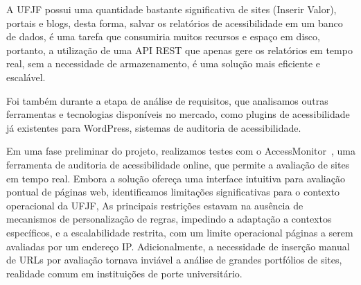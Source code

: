 \documentclass[12pt]{article}
\begin{document}
A UFJF possui uma quantidade bastante significativa de sites (Inserir Valor), portais e blogs, desta
forma, salvar os relatórios de acessibilidade em um banco de dados, é uma tarefa que 
consumiria muitos recursos e espaço em disco, portanto, a utilização de uma API REST
que apenas gere os relatórios em tempo real, sem a necessidade de armazenamento, é 
uma solução mais eficiente e escalável.
 
Foi também durante a etapa de análise de requisitos, que analisamos 
outras ferramentas e tecnologias disponíveis no mercado, como plugins 
de acessibilidade já existentes para WordPress, sistemas de auditoria de acessibilidade.

Em uma fase preliminar do projeto, realizamos testes com o AccessMonitor~, uma ferramenta de auditoria de acessibilidade online, que permite a avaliação de sites em tempo real. Embora a solução ofereça uma interface intuitiva para avaliação pontual de páginas web, identificamos limitações significativas para o contexto operacional da UFJF, As principais restrições estavam na ausência de mecanismos de personalização de regras, impedindo a adaptação a contextos específicos, e a escalabilidade restrita, com um limite operacional páginas a serem avaliadas por um endereço IP\@. Adicionalmente, a necessidade de inserção manual de URLs por avaliação tornava inviável a análise de grandes portfólios de sites, realidade comum em instituições de porte universitário.

\nocite{*}
\printbibliography[title={Referências}]
\end{document}
